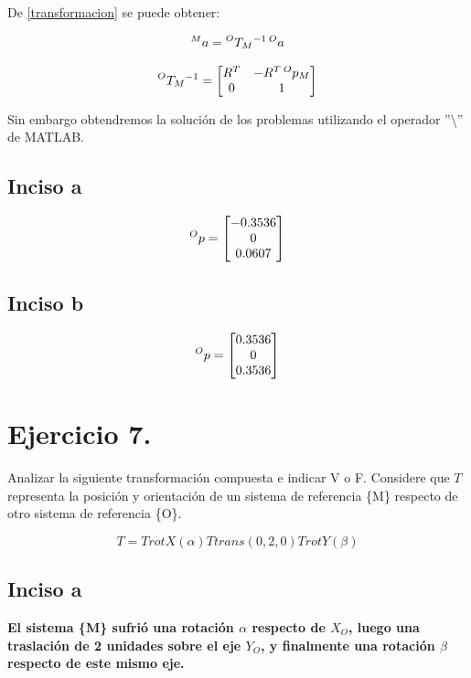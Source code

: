 \documentclass[a4paper,12pt]{article}
\begin{document}
De \cref{transformacion} se puede obtener:

\begin{equation}
    \prescript{M}{}{a} = \prescript{O}{}{T_M}^{-1}\prescript{O}{}{a}
    \label{transformacion inversa}
\end{equation}

\begin{equation}
    \prescript{O}{}{T_M}^{-1} =
    \begin{bmatrix}
        R^T & -R^T\prescript{O}{}{p_M}\\
        0   &   1
    \end{bmatrix}
    \label{matriz homogenea inversa}
\end{equation}

Sin embargo obtendremos la solución de los problemas utilizando el operador ''\textbackslash'' de MATLAB.

\subsection{Inciso a}
\[
    \prescript{O}{}{p} =
    \begin{bmatrix}
        -0.3536\\
        0      \\
        0.0607
    \end{bmatrix}
\]
\subsection{Inciso b}
\[
    \prescript{O}{}{p} =
    \begin{bmatrix}
        0.3536\\
        0     \\
        0.3536
    \end{bmatrix}
\]

\section{Ejercicio 7.}
Analizar la siguiente transformación compuesta e indicar V o F. Considere que $T$
representa la posición y orientación de un sistema de referencia \{M\} respecto de otro sistema
de referencia \{O\}.

\[T = TrotX(\alpha) Ttrans(0,2,0) TrotY(\beta)\]

\subsection{Inciso a}
\textbf{El sistema \{M\} sufrió una rotación $\alpha$ respecto de $X_O$, luego una traslación de 2
unidades sobre el eje $Y_O$, y finalmente una rotación $\beta$ respecto de este mismo eje.}
\vspace*{0.5 cm}
\end{document}
